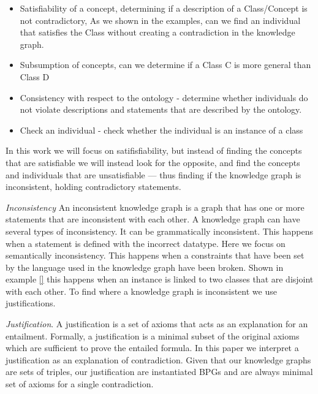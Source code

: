 \documentclass[11pt,letterpaper ,oneside ]{book}
\begin{document}
\begin{itemize}
	\item Satisfiability of a concept, determining if a description of a Class/Concept is not contradictory, As we shown in the examples, can we find an individual that satisfies the Class without creating a contradiction in the knowledge graph. 
	\item Subsumption of concepts, can we determine if a Class C is more general than Class D
	\item Consistency with respect to the ontology - determine whether individuals do not violate descriptions and statements that are described by the ontology.
	\item Check an individual - check whether the individual is an instance of a class
\end{itemize}

In this work we will focus on satifisfiability, but instead of finding the concepts that are satisfiable we will instead look for the opposite, and find the concepts and individuals that are unsatisfiable — thus finding if the knowledge graph is inconsistent, holding contradictory statements.

\textit{Inconsistency} An inconsistent knowledge graph is a graph that has one or more statements that are inconsistent with each other. A knowledge graph can have several types of inconsistency. It can be grammatically inconsistent. This happens when a statement is defined with the incorrect datatype. Here we focus on semantically inconsistency. This happens when a constraints that have been set by the language used in the knowledge graph have been broken. Shown in example \ref{} this happens when an instance is linked to two classes that are disjoint with each other. To find where a knowledge graph is inconsistent we use justifications.   

\textit{Justification}. A justification\cite{Horridge:2009} is a set of axioms that acts as an explanation for an entailment.
Formally, a justification is a minimal subset of the original axioms which are sufficient to prove the entailed formula. In this paper we interpret a justification as an explanation of contradiction. Given that our knowledge graphs are sets of triples, our justification are instantiated BPGs and are always minimal set of axioms for a single contradiction. \\
\end{document}
